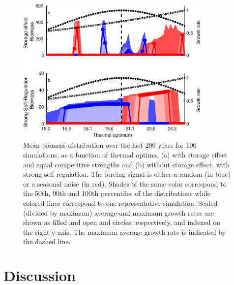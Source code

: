 \documentclass[a4paper,12pt]{article}
\begin{document}
\begin{figure}[!ht]
\begin{centering}
\includegraphics[bb=0bp 0bp 428bp 338bp,width=0.85\textwidth]{Fig4}
\par\end{centering}
\caption{Mean biomass distribution over the last 200 years for 100 simulations,
as a function of thermal optima, (a) with storage effect and equal
competitive strengths and (b) without storage effect, with strong
self-regulation. The forcing signal is either a random (in blue) or
a seasonal noise (in red). Shades of the same color correspond to
the 50th, 90th and 100th percentiles of the distributions while colored
lines correspond to one representative simulation. Scaled (divided
by maximum) average and maximum growth rates are shown as filled and
open and circles, respectively, and indexed on the right y-axis. The
maximum average growth rate is indicated by the dashed line.\label{fig:Unstable_cases}}
\end{figure}


\section{Discussion}
\end{document}

